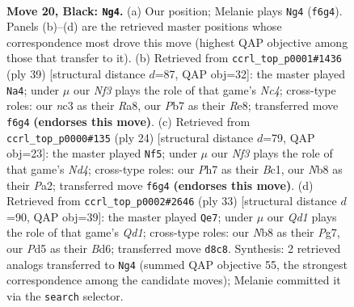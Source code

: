 \documentclass[11pt]{article}
\begin{document}
\clearpage

\begin{figure}[p]\centering
\begin{subfigure}{0.46\textwidth}\centering
\resizebox{\linewidth}{!}{%
\newchessgame
\chessboard[
  setfen={rn1qr1k1/pp1bbppp/5n2/2PpP3/7N/P1N4P/1P1B1PP1/1BRQR1K1 b - - 0 20},
  showmover=false,
  pgfstyle=straightmove, color=movearrow, markmove={f6-g4}
]}
\caption{}
\end{subfigure}\hfill
\begin{subfigure}{0.46\textwidth}\centering
\resizebox{\linewidth}{!}{%
\newchessgame
\chessboard[
  setfen={r2qr1k1/1ppb1pb1/3p1np1/2n4p/1PPNP3/2N3PP/1B3PB1/1R1QR1K1 b - - 0 20},
  showmover=false,
  pgfstyle=straightmove, color=movearrow, markmove={c5-a4}
]}
\caption{}
\end{subfigure}
\\[4pt]
\begin{subfigure}{0.46\textwidth}\centering
\resizebox{\linewidth}{!}{%
\newchessgame
\chessboard[
  setfen={r2q1rk1/1p1b1pp1/p1nb1n1p/3p4/3N4/2PB1N1P/PP3PP1/R1BQR1K1 w - - 0 13},
  showmover=false,
  pgfstyle=straightmove, color=movearrow, markmove={d4-f5}
]}
\caption{}
\end{subfigure}\hfill
\begin{subfigure}{0.46\textwidth}\centering
\resizebox{\linewidth}{!}{%
\newchessgame
\chessboard[
  setfen={r1bqr1k1/1p3pp1/p2b1n1p/3p4/4n3/1PNBPN1P/PB3PP1/2RQR1K1 b - - 6 17},
  showmover=false,
  pgfstyle=straightmove, color=movearrow, markmove={d8-e7}
]}
\caption{}
\end{subfigure}
\caption{\textbf{Move 20, Black: \texttt{Ng4}.} (a) Our position; Melanie plays \texttt{Ng4} (\texttt{f6g4}). Panels (b)--(d) are the retrieved master positions whose correspondence most drove this move (highest QAP objective among those that transfer to it). (b) Retrieved from \texttt{ccrl\_top\_p0001\#1436} (ply 39) [structural distance $d$=87, QAP obj=32]: the master played \texttt{Na4}; under $\mu$ our \emph{Nf3} plays the role of that game's \emph{Nc4}; cross-type roles: our \emph{n}c3 as their \emph{R}a8, our \emph{P}b7 as their \emph{R}e8; transferred move \texttt{f6g4} \textbf{(endorses this move)}. (c) Retrieved from \texttt{ccrl\_top\_p0000\#135} (ply 24) [structural distance $d$=79, QAP obj=23]: the master played \texttt{Nf5}; under $\mu$ our \emph{Nf3} plays the role of that game's \emph{Nd4}; cross-type roles: our \emph{P}h7 as their \emph{B}c1, our \emph{N}b8 as their \emph{P}a2; transferred move \texttt{f6g4} \textbf{(endorses this move)}. (d) Retrieved from \texttt{ccrl\_top\_p0002\#2646} (ply 33) [structural distance $d$=90, QAP obj=39]: the master played \texttt{Qe7}; under $\mu$ our \emph{Qd1} plays the role of that game's \emph{Qd1}; cross-type roles: our \emph{N}b8 as their \emph{P}g7, our \emph{P}d5 as their \emph{B}d6; transferred move \texttt{d8c8}. Synthesis: 2 retrieved analogs transferred to \texttt{Ng4} (summed QAP objective 55, the strongest correspondence among the candidate moves); Melanie committed it via the \texttt{search} selector.}
\label{fig:thought-m39}
\end{figure}
\end{document}
